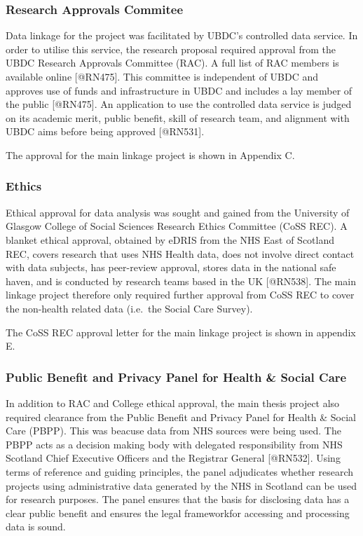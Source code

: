 \documentclass[]{article}
\begin{document}
\subsubsection{Research Approvals Commitee}\label{subsec:rac}

Data linkage for the project was facilitated by UBDC's controlled data
service. In order to utilise this service, the research proposal
required approval from the UBDC Research Approvals Committee (RAC). A
full list of RAC members is available online {[}@RN475{]}. This
committee is independent of UBDC and approves use of funds and
infrastructure in UBDC and includes a lay member of the public
{[}@RN475{]}. An application to use the controlled data service is
judged on its academic merit, public benefit, skill of research team,
and alignment with UBDC aims before being approved {[}@RN531{]}.

The approval for the main linkage project is shown in Appendix C.

\subsubsection{Ethics}\label{subsec:ethics}

Ethical approval for data analysis was sought and gained from the
University of Glasgow College of Social Sciences Research Ethics
Committee (CoSS REC). A blanket ethical approval, obtained by eDRIS from
the NHS East of Scotland REC, covers research that uses NHS Health data,
does not involve direct contact with data subjects, has peer-review
approval, stores data in the national safe haven, and is conducted by
research teams based in the UK {[}@RN538{]}. The main linkage project
therefore only required further approval from CoSS REC to cover the
non-health related data (i.e.~the Social Care Survey).

The CoSS REC approval letter for the main linkage project is shown in
appendix E.

\subsubsection{Public Benefit and Privacy Panel for Health \& Social Care}\label{subsec:pbpp}

In addition to RAC and College ethical approval, the main thesis project
also required clearance from the Public Benefit and Privacy Panel for
Health \& Social Care (PBPP). This was beacuse data from NHS sources
were being used. The PBPP acts as a decision making body with delegated
responsibility from NHS Scotland Chief Executive Officers and the
Registrar General {[}@RN532{]}. Using terms of reference and guiding
principles, the panel adjudicates whether research projects using
administrative data generated by the NHS in Scotland can be used for
research purposes. The panel ensures that the basis for disclosing data
has a clear public benefit and ensures the legal frameworkfor accessing
and processing data is sound.
\end{document}
